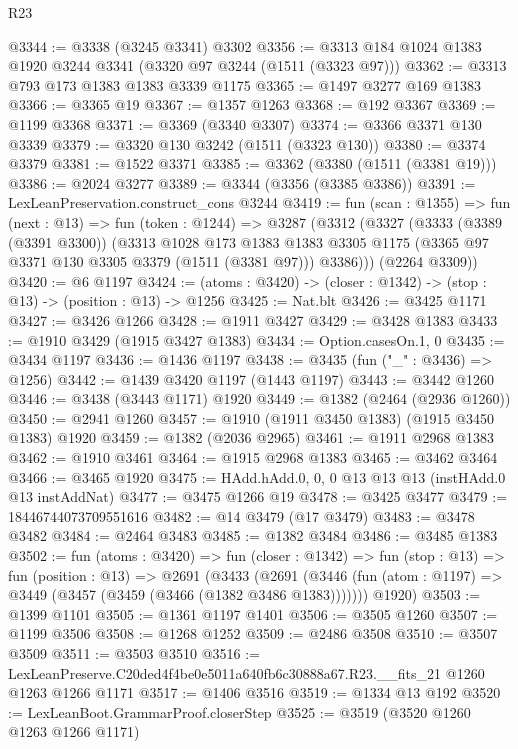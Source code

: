 \begin{lexlean}{R23}
\begin{coremodule}
@3344 := @3338 (@3245 @3341) @3302
@3356 := @3313 @184 @1024 @1383 @1920 @3244 @3341 (@3320 @97 @3244 (@1511 (@3323 @97)))
@3362 := @3313 @793 @173 @1383 @1383 @3339 @1175
@3365 := @1497 @3277 @169 @1383
@3366 := @3365 @19
@3367 := @1357 @1263
@3368 := @192 @3367
@3369 := @1199 @3368
@3371 := @3369 (@3340 @3307)
@3374 := @3366 @3371 @130 @3339
@3379 := @3320 @130 @3242 (@1511 (@3323 @130))
@3380 := @3374 @3379
@3381 := @1522 @3371
@3385 := @3362 (@3380 (@1511 (@3381 @19)))
@3386 := @2024 @3277
@3389 := @3344 (@3356 (@3385 @3386))
@3391 := LexLeanPreservation.construct_cons @3244
@3419 := fun (scan : @1355) =>
  fun (next : @13) =>
  fun (token : @1244) =>
  @3287
    (@3312
      (@3327
        (@3333
          (@3389 (@3391 @3300))
          (@3313
            @1028
            @173
            @1383
            @1383
            @3305
            @1175
            (@3365 @97 @3371 @130 @3305 @3379 (@1511 (@3381 @97)))
            @3386)))
      (@2264 @3309))
@3420 := @6 @1197
@3424 := (atoms : @3420) -> (closer : @1342) -> (stop : @13) -> (position : @13) -> @1256
@3425 := Nat.blt
@3426 := @3425 @1171
@3427 := @3426 @1266
@3428 := @1911 @3427
@3429 := @3428 @1383
@3433 := @1910 @3429 (@1915 @3427 @1383)
@3434 := Option.casesOn.{1, 0}
@3435 := @3434 @1197
@3436 := @1436 @1197
@3438 := @3435 (fun ("_" : @3436) => @1256)
@3442 := @1439 @3420 @1197 (@1443 @1197)
@3443 := @3442 @1260
@3446 := @3438 (@3443 @1171) @1920
@3449 := @1382 (@2464 (@2936 @1260))
@3450 := @2941 @1260
@3457 := @1910 (@1911 @3450 @1383) (@1915 @3450 @1383) @1920
@3459 := @1382 (@2036 @2965)
@3461 := @1911 @2968 @1383
@3462 := @1910 @3461
@3464 := @1915 @2968 @1383
@3465 := @3462 @3464
@3466 := @3465 @1920
@3475 := HAdd.hAdd.{0, 0, 0} @13 @13 @13 (instHAdd.{0} @13 instAddNat)
@3477 := @3475 @1266 @19
@3478 := @3425 @3477
@3479 := 18446744073709551616
@3482 := @14 @3479 (@17 @3479)
@3483 := @3478 @3482
@3484 := @2464 @3483
@3485 := @1382 @3484
@3486 := @3485 @1383
@3502 := fun (atoms : @3420) =>
  fun (closer : @1342) =>
  fun (stop : @13) =>
  fun (position : @13) =>
  @2691
    (@3433
      (@2691 (@3446 (fun (atom : @1197) => @3449 (@3457 (@3459 (@3466 (@1382 @3486 @1383)))))))
      @1920)
@3503 := @1399 @1101
@3505 := @1361 @1197 @1401
@3506 := @3505 @1260
@3507 := @1199 @3506
@3508 := @1268 @1252
@3509 := @2486 @3508
@3510 := @3507 @3509
@3511 := @3503 @3510
@3516 := LexLeanPreserve.C20ded4f4be0e5011a640fb6c30888a67.R23.__fits_21 @1260 @1263 @1266 @1171
@3517 := @1406 @3516
@3519 := @1334 @13 @192
@3520 := LexLeanBoot.GrammarProof.closerStep
@3525 := @3519 (@3520 @1260 @1263 @1266 @1171)

\end{coremodule}
\end{lexlean}
